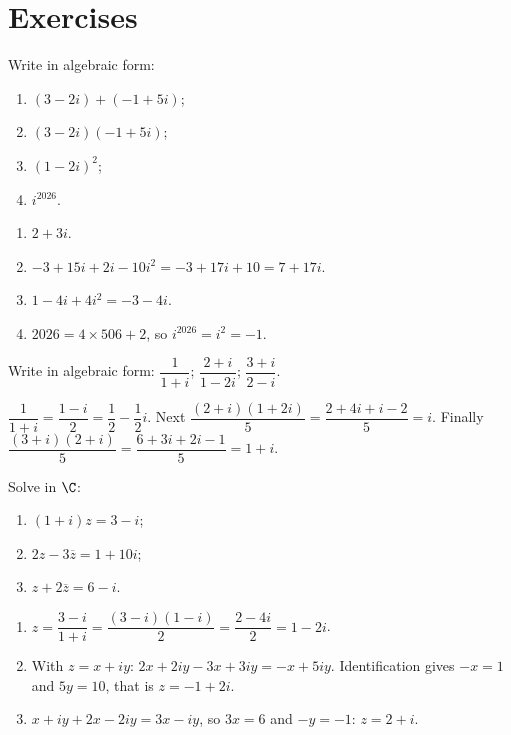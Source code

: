 \mxnewpage
\section{Exercises}
\begin{exercise}
Write in algebraic form:
\begin{enumerate}
\item $(3-2i)+(-1+5i)$;
\item $(3-2i)(-1+5i)$;
\item $(1-2i)^2$;
\item $i^{2026}$.
\end{enumerate}
\end{exercise}
\begin{solution}
\begin{enumerate}
\item $2+3i$.
\item $-3+15i+2i-10i^2=-3+17i+10=7+17i$.
\item $1-4i+4i^2=-3-4i$.
\item $\num{2026}=4\times506+2$, so $i^{2026}=i^2=-1$.
\end{enumerate}
\end{solution}

\begin{exercise}
Write in algebraic form: $\dfrac1{1+i}$; $\dfrac{2+i}{1-2i}$; $\dfrac{3+i}{2-i}$.
\end{exercise}
\begin{solution}
$\dfrac1{1+i}=\dfrac{1-i}{2}=\dfrac12-\dfrac12i$. Next $\dfrac{(2+i)(1+2i)}{5}=\dfrac{2+4i+i-2}{5}=i$. Finally $\dfrac{(3+i)(2+i)}{5}=\dfrac{6+3i+2i-1}{5}=1+i$.
\end{solution}

\begin{exercise}[Equations]
Solve in $\C$:
\begin{enumerate}
\item $(1+i)z=3-i$;
\item $2z-3\overline z=1+10i$;
\item $z+2\overline z=6-i$.
\end{enumerate}
\end{exercise}
\begin{solution}
\begin{enumerate}
\item $z=\dfrac{3-i}{1+i}=\dfrac{(3-i)(1-i)}{2}=\dfrac{2-4i}{2}=1-2i$.
\item With $z=x+iy$: $2x+2iy-3x+3iy=-x+5iy$. Identification gives $-x=1$ and $5y=10$, that is $z=-1+2i$.
\item $x+iy+2x-2iy=3x-iy$, so $3x=6$ and $-y=-1$: $z=2+i$.
\end{enumerate}
\end{solution}


